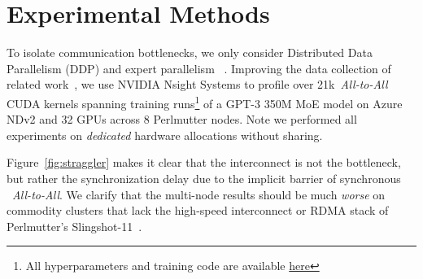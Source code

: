 
\section{Experimental Methods}\label{sec:experimental_methods}
To isolate communication bottlenecks, we only consider Distributed Data Parallelism (DDP) and expert parallelism
~\cite{DBLP:journals/corr/abs-2006-16668}.
Improving the data collection of related work~\cite{288705},
we use NVIDIA Nsight Systems to profile over 21k~\emph{All-to-All} CUDA kernels spanning
training runs\footnote{All hyperparameters and training code are available
\href{https://github.com/osayamenja/Megatron-DeepSpeed}{here}}
of a GPT-3 350M MoE model on Azure NDv2 and 32 GPUs across 8 Perlmutter nodes.
Note we performed all experiments on \emph{dedicated} hardware allocations without sharing.

Figure~\ref{fig:straggler} makes it clear that the interconnect is not the bottleneck,
but rather the synchronization delay due to the implicit barrier of synchronous ~\emph{All-to-All}.
We clarify that the multi-node results should be much \emph{worse} on commodity clusters that lack
the high-speed interconnect or RDMA stack of Perlmutter's Slingshot-11~\cite{Khorassani2023}.
